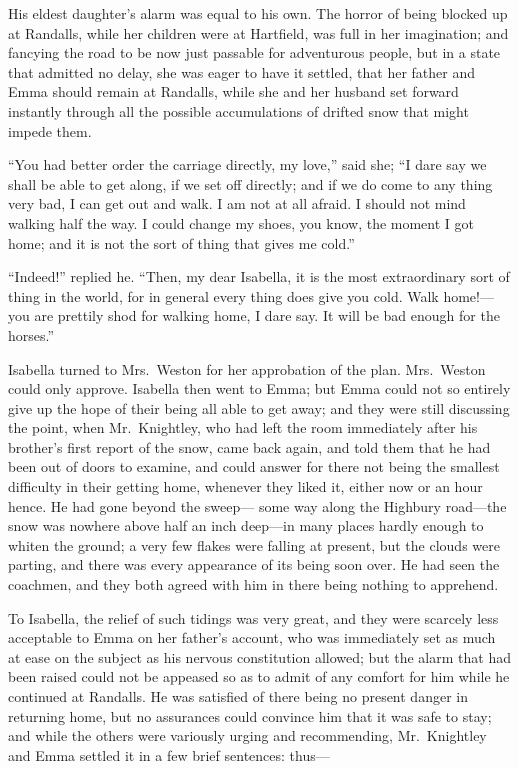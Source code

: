 His eldest daughter's alarm was equal to his own.  The horror of
being blocked up at Randalls, while her children were at Hartfield,
was full in her imagination; and fancying the road to be now just
passable for adventurous people, but in a state that admitted no delay,
she was eager to have it settled, that her father and Emma should remain
at Randalls, while she and her husband set forward instantly through
all the possible accumulations of drifted snow that might impede them.

``You had better order the carriage directly, my love,'' said she;
``I dare say we shall be able to get along, if we set off directly;
and if we do come to any thing very bad, I can get out and walk.
I am not at all afraid.  I should not mind walking half the way.
I could change my shoes, you know, the moment I got home; and it is not
the sort of thing that gives me cold.''

``Indeed!'' replied he.  ``Then, my dear Isabella, it is the most
extraordinary sort of thing in the world, for in general every
thing does give you cold.  Walk home!---you are prettily shod
for walking home, I dare say.  It will be bad enough for the horses.''

Isabella turned to Mrs.\ Weston for her approbation of the plan.
Mrs.\ Weston could only approve.  Isabella then went to Emma;
but Emma could not so entirely give up the hope of their being
all able to get away; and they were still discussing the point,
when Mr.\ Knightley, who had left the room immediately after his
brother's first report of the snow, came back again, and told them
that he had been out of doors to examine, and could answer for there
not being the smallest difficulty in their getting home, whenever they
liked it, either now or an hour hence.  He had gone beyond the sweep---%
some way along the Highbury road---the snow was nowhere above half
an inch deep---in many places hardly enough to whiten the ground;
a very few flakes were falling at present, but the clouds were parting,
and there was every appearance of its being soon over.  He had seen
the coachmen, and they both agreed with him in there being nothing
to apprehend.

To Isabella, the relief of such tidings was very great, and they
were scarcely less acceptable to Emma on her father's account,
who was immediately set as much at ease on the subject as his nervous
constitution allowed; but the alarm that had been raised could not
be appeased so as to admit of any comfort for him while he continued
at Randalls.  He was satisfied of there being no present danger in
returning home, but no assurances could convince him that it was safe
to stay; and while the others were variously urging and recommending,
Mr.\ Knightley and Emma settled it in a few brief sentences:  thus---%

